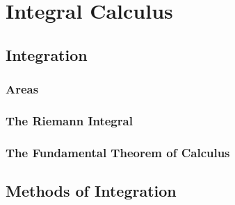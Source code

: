 \chapter{Integral Calculus}
    \section{Integration}
        \subsection{Areas}
        \subsection{The Riemann Integral}
        \subsection{The Fundamental Theorem of Calculus}
    \section{Methods of Integration}
